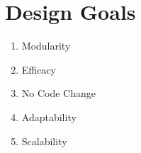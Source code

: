 \section{Design Goals}
\begin{enumerate}
\item Modularity
\item Efficacy
\item No Code Change
\item Adaptability
\item Scalability
\end{enumerate}
